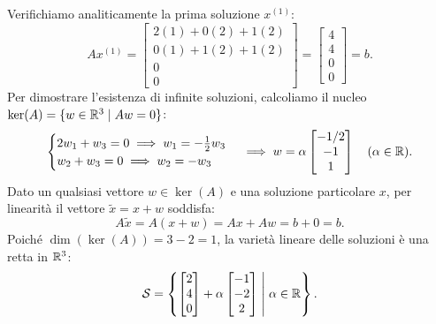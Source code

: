 \begin{example}
Verifichiamo analiticamente la prima soluzione $x^{(1)}$:
\begin{equation}
    A x^{(1)} = \begin{bmatrix}
        2(1) + 0(2) + 1(2) \\
        0(1) + 1(2) + 1(2) \\
        0 \\ 0
    \end{bmatrix} = \begin{bmatrix} 4 \\ 4 \\ 0 \\ 0 \end{bmatrix} = b.
\end{equation}
Per dimostrare l'esistenza di infinite soluzioni, calcoliamo il nucleo $\ker(A) = \{w \in \mathbb{R}^3 \mid Aw = 0\}$:
\begin{equation}
    \begin{cases}
        2w_1 + w_3 = 0 \implies w_1 = -\frac{1}{2}w_3 \\
        w_2 + w_3 = 0 \implies w_2 = -w_3
    \end{cases}
    \implies
    w = \alpha \begin{bmatrix} -1/2 \\ -1 \\ 1 \end{bmatrix} \quad (\alpha \in \mathbb{R}).
\end{equation}
Dato un qualsiasi vettore $w \in \ker(A)$ e una soluzione particolare $x$, per linearit\`a il vettore $\tilde{x} = x + w$ soddisfa:
\begin{equation}
    A\tilde{x} = A(x + w) = Ax + Aw = b + 0 = b.
\end{equation}
Poich\'e $\dim(\ker(A)) = 3 - 2 = 1$, la variet\`a lineare delle soluzioni \`e una retta in $\mathbb{R}^3$:
\begin{equation}
    \mathcal{S} = \left\{ \begin{bmatrix} 2 \\ 4 \\ 0 \end{bmatrix} + \alpha \begin{bmatrix} -1 \\ -2 \\ 2 \end{bmatrix} \;\middle|\; \alpha \in \mathbb{R} \right\}.
\end{equation}
\end{example}

